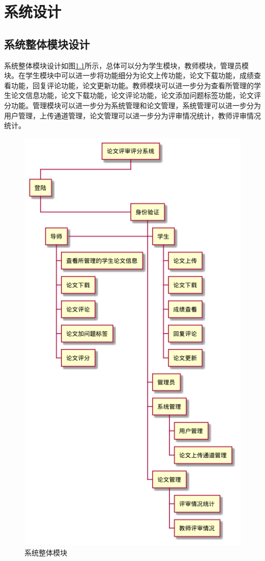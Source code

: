 
\chapter{系统设计}

\label{chap07}


\section{系统整体模块设计}

系统整体模块设计如图\ref{system-wbs}所示，总体可以分为学生模块，教师模块，管理员模块。在学生模块中可以进一步将功能细分为论文上传功能，论文下载功能，成绩查看功能，回复评论功能，论文更新功能。教师模块可以进一步分为查看所管理的学生论文信息功能，论文下载功能，论文评论功能，论文添加问题标签功能，论文评分功能。管理模块可以进一步分为系统管理和论文管理，系统管理可以进一步分为用户管理，上传通道管理，论文管理可以进一步分为评审情况统计，教师评审情况统计。

\begin{figure}[h]
    \centering
    \includegraphics[scale = 0.6]{out/uml/WBS/系统WBS/系统WBS.png}
    \caption{\song\wuhao 系统整体模块}
    \label{system-wbs}
\end{figure}

